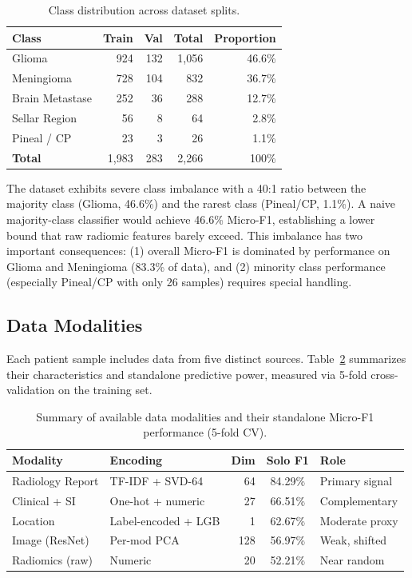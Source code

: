 \begin{table}[H]
\centering
\caption{Class distribution across dataset splits.}
\label{tab:class_dist}
\begin{tabular}{lrrrr}
\toprule
\textbf{Class} & \textbf{Train} & \textbf{Val} & \textbf{Total} & \textbf{Proportion} \\
\midrule
Glioma & 924 & 132 & 1,056 & 46.6\% \\
Meningioma & 728 & 104 & 832 & 36.7\% \\
Brain Metastase & 252 & 36 & 288 & 12.7\% \\
Sellar Region & 56 & 8 & 64 & 2.8\% \\
Pineal / CP & 23 & 3 & 26 & 1.1\% \\
\midrule
\textbf{Total} & 1,983 & 283 & 2,266 & 100\% \\
\bottomrule
\end{tabular}
\end{table}

The dataset exhibits severe class imbalance with a 40:1 ratio between the majority class (Glioma, 46.6\%) and the rarest class (Pineal/CP, 1.1\%). A naive majority-class classifier would achieve 46.6\% Micro-F1, establishing a lower bound that raw radiomic features barely exceed. This imbalance has two important consequences: (1) overall Micro-F1 is dominated by performance on Glioma and Meningioma (83.3\% of data), and (2) minority class performance (especially Pineal/CP with only 26 samples) requires special handling.

\subsection{Data Modalities}
\label{sec:modalities}

Each patient sample includes data from five distinct sources. Table~\ref{tab:modalities} summarizes their characteristics and standalone predictive power, measured via 5-fold cross-validation on the training set.

\begin{table}[H]
\centering
\caption{Summary of available data modalities and their standalone Micro-F1 performance (5-fold CV).}
\label{tab:modalities}
\begin{tabular}{llrcl}
\toprule
\textbf{Modality} & \textbf{Encoding} & \textbf{Dim} & \textbf{Solo F1} & \textbf{Role} \\
\midrule
Radiology Report & TF-IDF + SVD-64 & 64 & 84.29\% & Primary signal \\
Clinical + SI & One-hot + numeric & 27 & 66.51\% & Complementary \\
Location & Label-encoded + LGB & 1 & 62.67\% & Moderate proxy \\
Image (ResNet) & Per-mod PCA & 128 & 56.97\% & Weak, shifted \\
Radiomics (raw) & Numeric & 20 & 52.21\% & Near random \\
\bottomrule
\end{tabular}
\end{table}

